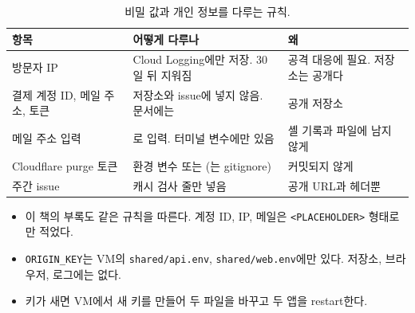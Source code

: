 \begin{table}[H]
  \caption{비밀 값과 개인 정보를 다루는 규칙.}\label{tab:05-secrets}
  \small
  \begin{tabularx}{\linewidth}{L{3.8cm} Y Y}
    \toprule
    항목 & 어떻게 다루나 & 왜 \\
    \midrule
    방문자 IP & Cloud Logging에만 저장. 30일 뒤 지워짐 & 공격 대응에 필요. 저장소는 공개다 \\
    \midrule
    결제 계정 ID, 메일 주소, 토큰 & 저장소와 issue에 넣지 않음. 문서에는  & 공개 저장소 \\
    \midrule
    메일 주소 입력 & 로 입력. 터미널 변수에만 있음 & 셸 기록과 파일에 남지 않게 \\
    \midrule
    Cloudflare purge 토큰 & 환경 변수 또는  (는 gitignore) & 커밋되지 않게 \\
    \midrule
    주간 issue & 캐시 검사 줄만 넣음 & 공개 URL과 헤더뿐 \\
    \bottomrule
  \end{tabularx}
\end{table}

\begin{itemize}[nosep]
  \item 이 책의 부록도 같은 규칙을 따른다. 계정 ID, IP, 메일은 \texttt{<PLACEHOLDER>} 형태로만 적었다.
  \item \texttt{ORIGIN\_KEY}는 VM의 \texttt{shared/api.env}, \texttt{shared/web.env}에만 있다. 저장소, 브라우저, 로그에는 없다.
  \item 키가 새면 VM에서 새 키를 만들어 두 파일을 바꾸고 두 앱을 restart한다.
\end{itemize}
